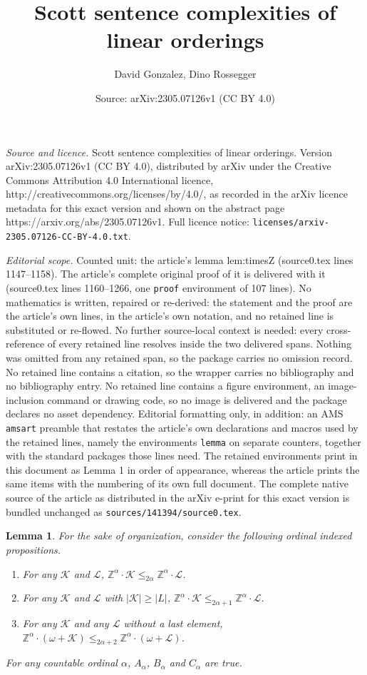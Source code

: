 \documentclass[10pt,a4paper]{amsart}
\title{Scott sentence complexities of linear orderings}
\author{David Gonzalez, Dino Rossegger}
\date{Source: arXiv:2305.07126v1 (CC BY 4.0)}
\newtheorem{lemma}{Lemma}
\newcommand{\K}{\mathcal{K}}
\renewcommand{\L}{\mathcal{L}}
\newcommand{\Z}{\mathbb{Z}}
\providecommand{\tightlist}{%
  \setlength{\itemsep}{0pt}\setlength{\parskip}{0pt}}
\begin{document}
\maketitle

\noindent\emph{Source and licence.} Scott sentence complexities of linear orderings. Version arXiv:2305.07126v1 (CC BY 4.0), distributed by arXiv under the Creative Commons Attribution 4.0 International licence, http://creativecommons.org/licenses/by/4.0/, as recorded in the arXiv licence metadata for this exact version and shown on the abstract page https://arxiv.org/abs/2305.07126v1. Full licence notice: \texttt{licenses/arxiv-2305.07126-CC-BY-4.0.txt}.\par\smallskip

\noindent\textit{Editorial scope.} Counted unit: the article's lemma lem:timesZ (source0.tex lines 1147--1158). The article's complete original proof of it is delivered with it (source0.tex lines 1160--1266, one \texttt{proof} environment of 107 lines). No mathematics is written, repaired or re-derived: the statement and the proof are the article's own lines, in the article's own notation, and no retained line is substituted or re-flowed.  No further source-local context is needed: every cross-reference of every retained line resolves inside the two delivered spans.  Nothing was omitted from any retained span, so the package carries no omission record.  No retained line contains a citation, so the wrapper carries no bibliography and no bibliography entry.  No retained line contains a figure environment, an image-inclusion command or drawing code, so no image is delivered and the package declares no asset dependency.  Editorial formatting only, in addition: an AMS \texttt{amsart} preamble that restates the article's own declarations and macros used by the retained lines, namely the environments \texttt{lemma} on separate counters, together with the standard packages those lines need.  The retained environments print in this document as Lemma 1 in order of appearance, whereas the article prints the same items with the numbering of its own full document.  The complete native source of the article as distributed in the arXiv e-print for this exact version is bundled unchanged as \texttt{sources/141394/source0.tex}.
\begin{lemma}\label{lem:timesZ}
For the sake of organization, consider the following ordinal indexed propositions.
\begin{enumerate}\tightlist
\item[($A_\alpha$)] For any $\K$ and $\L$, $\Z^\alpha\cdot \K
    \leq_{2\alpha}\Z^\alpha\cdot \L$.
\item[($B_\alpha$)] For any $\K$ and $\L$ with $|\K|\geq|L|$, $\Z^\alpha\cdot \K
    \leq_{2\alpha+1}\Z^\alpha\cdot \L$.
\item[($C_\alpha$)] For any $\K$ and any $\L$ without a last element,
    $\Z^\alpha\cdot(\omega+\K)\leq_{2\alpha+2} \Z^\alpha\cdot(\omega+\L)$.
\end{enumerate}
For any countable ordinal $\alpha$, $A_\alpha$, $B_\alpha$ and $C_\alpha$ are true.
\end{lemma}
\end{document}
